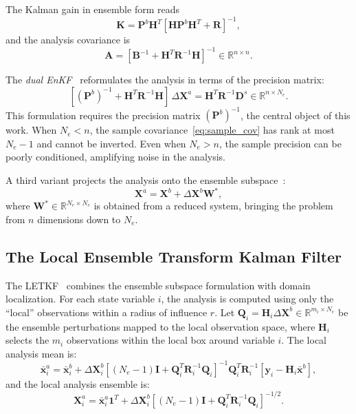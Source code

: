 The Kalman gain in ensemble form reads
\begin{equation}
\label{eq:kalman_gain}
\mathbf{K} = \mathbf{P}^b \mathbf{H}^T [\mathbf{H}\mathbf{P}^b\mathbf{H}^T + \mathbf{R}]^{-1},
\end{equation}
and the analysis covariance is
\begin{equation}
\label{eq:analysis_cov}
\mathbf{A} = [\mathbf{B}^{-1} + \mathbf{H}^T \mathbf{R}^{-1} \mathbf{H}]^{-1} \in \mathbb{R}^{n \times n}.
\end{equation}

The \emph{dual EnKF}~\citep{nino2018ensemble} reformulates the analysis in terms of the precision matrix:
\begin{equation}
\label{eq:dual_enkf}
[(\mathbf{P}^b)^{-1} + \mathbf{H}^T\mathbf{R}^{-1}\mathbf{H}] \, \Delta\mathbf{X}^a = \mathbf{H}^T\mathbf{R}^{-1}\mathbf{D}^s \in \mathbb{R}^{n \times N_e}.
\end{equation}
This formulation requires the precision matrix $(\mathbf{P}^b)^{-1}$, the central object of this work. When $N_e < n$, the sample covariance~\eqref{eq:sample_cov} has rank at most $N_e - 1$ and cannot be inverted. Even when $N_e > n$, the sample precision can be poorly conditioned, amplifying noise in the analysis.

A third variant projects the analysis onto the ensemble subspace~\citep{nino2022teda}:
\begin{equation}
\label{eq:ensemble_space}
\mathbf{X}^a = \mathbf{X}^b + \Delta\mathbf{X}^b \mathbf{W}^*,
\end{equation}
where $\mathbf{W}^* \in \mathbb{R}^{N_e \times N_e}$ is obtained from a reduced system, bringing the problem from $n$ dimensions down to $N_e$.

\subsection{The Local Ensemble Transform Kalman Filter}
\label{sec:letkf}

The LETKF~\citep{hunt2007efficient} combines the ensemble subspace formulation with domain localization. For each state variable $i$, the analysis is computed using only the ``local'' observations within a radius of influence $r$. Let $\mathbf{Q}_i = \mathbf{H}_i \Delta\mathbf{X}^b \in \mathbb{R}^{m_i \times N_e}$ be the ensemble perturbations mapped to the local observation space, where $\mathbf{H}_i$ selects the $m_i$ observations within the local box around variable $i$. The local analysis mean is:
\begin{equation}
\label{eq:letkf_mean}
\bar{\mathbf{x}}_i^a = \bar{\mathbf{x}}_i^b + \Delta\mathbf{X}_i^b \left[(N_e - 1)\mathbf{I} + \mathbf{Q}_i^T \mathbf{R}_i^{-1} \mathbf{Q}_i\right]^{-1} \mathbf{Q}_i^T \mathbf{R}_i^{-1} [\mathbf{y}_i - \mathbf{H}_i \bar{\mathbf{x}}^b],
\end{equation}
and the local analysis ensemble is:
\begin{equation}
\label{eq:letkf_ensemble}
\mathbf{X}_i^a = \bar{\mathbf{x}}_i^a \mathbf{1}^T + \Delta\mathbf{X}_i^b \left[(N_e - 1)\mathbf{I} + \mathbf{Q}_i^T \mathbf{R}_i^{-1} \mathbf{Q}_i\right]^{-1/2}.
\end{equation}

